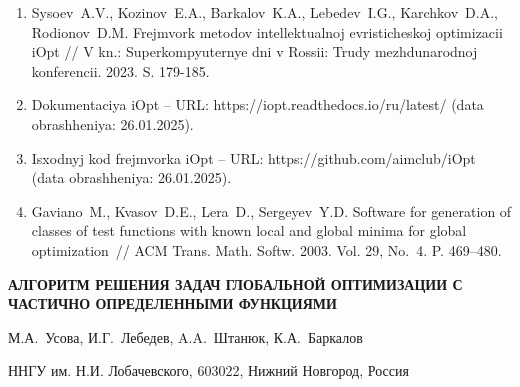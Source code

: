 \documentclass[a4paper,12pt,russian]{article}
\begin{document}
\begin{enumerate}
\item \label{rfa:enlit:iOptPaper}
Sysoev~A.V., Kozinov~E.A., Barkalov~K.A., Lebedev~I.G., Karchkov~D.A., Rodionov~D.M. Frejmvork metodov intellektualnoj evristicheskoj optimizacii iOpt // V kn.: Superkompyuternye dni v Rossii: Trudy mezhdunarodnoj konferencii. 2023. S. 179-185.

\item \label{rfa:enlit:iOptDocs}
Dokumentaciya iOpt -- URL: https://iopt.readthedocs.io/ru/latest/ (data obrashheniya: 26.01.2025).

\item \label{rfa:enlit:iOptGithub}
Isxodnyj kod frejmvorka iOpt -- URL: https://github.com/aimclub/iOpt (data obrashheniya: 26.01.2025).

\item \label{rfa:enlit:Gaviano2003}
Gaviano~M., Kvasov~D.E., Lera~D., Sergeyev~Y.D. Software for generation of classes of test functions with known local and global minima for global optimization~// ACM Trans. Math. Softw. 2003. Vol. 29, No.~4. P. 469--480.

\end{enumerate}

\begin{center}
	\textbf{АЛГОРИТМ РЕШЕНИЯ ЗАДАЧ ГЛОБАЛЬНОЙ ОПТИМИЗАЦИИ\break
    С ЧАСТИЧНО ОПРЕДЕЛЕННЫМИ ФУНКЦИЯМИ}
\end{center}

\begin{center}
	{М.А.~Усова, И.Г.~Лебедев, A.A.~Штанюк, К.А.~Баркалов }
\end{center}

\begin{center}
{ННГУ им. Н.И. Лобачевского, 603022, Нижний Новгород, Россия}
\end{center}
\end{document}
